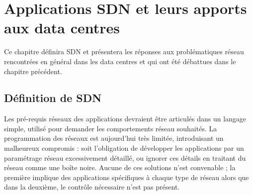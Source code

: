 
\chapter{Applications SDN et leurs apports aux data centres}

Ce chapitre définira SDN et présentera les réponses aux problématiques réseau rencontrées en général dans les data centres et qui ont été débattues dans le chapitre précédent. %

\section{Définition de SDN}

Les pré-requis réseaux des applications devraient être articulés dans un langage simple, utilisé pour demander les comportements réseau souhaités. La  programmation des réseaux est aujourd'hui très limitée, introduisant un malheureux compromis : soit l'obligation de développer les applications par un paramétrage réseau excessivement détaillé, ou ignorer ces détails en traitant du réseau comme une boîte noire.
Aucune de ces solutions n'est convenable ; la première implique des applications spécifiques à chaque type de réseau alors que dans la deuxième, le contrôle nécessaire %
n'est pas présent. 


